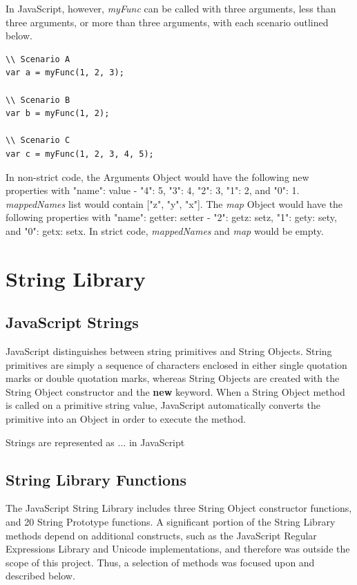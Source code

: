 \documentclass[a4paper,11pt,twoside]{report}
\begin{document}
In JavaScript, however, \textit{myFunc} can be called with three arguments, less than three arguments, or more than three arguments, with each scenario outlined below.
\begin{adjustwidth}{2cm}{2cm}
\begin{lstlisting}
\\ Scenario A
var a = myFunc(1, 2, 3);

\\ Scenario B
var b = myFunc(1, 2);

\\ Scenario C
var c = myFunc(1, 2, 3, 4, 5);
\end{lstlisting}
\end{adjustwidth}
In non-strict code, the Arguments Object would have the following new properties with "name": value - "4": 5, "3": 4, "2": 3, "1": 2, and "0": 1. \textit{mappedNames} list would contain ["z", "y", "x"]. The \textit{map} Object would have the following properties with "name": getter: setter - "2": getz: setz, "1": gety: sety, and "0": getx: setx. In strict code, \textit{mappedNames} and \textit{map} would be empty.

\chapter{String Library}
\section{JavaScript Strings}
JavaScript distinguishes between string primitives and String Objects. String primitives are simply a sequence of characters enclosed in either single quotation marks or double quotation marks, whereas String Objects are created with the String Object constructor and the \textbf{new} keyword. When a String Object method is called on a primitive string value, JavaScript automatically converts the primitive into an Object in order to execute the method.

Strings are represented as ... in JavaScript

\section{String Library Functions}\label{sec:stringmethods}
The JavaScript String Library includes three String Object constructor functions, and 20 String Prototype functions. A significant portion of the String Library methods depend on additional constructs, such as the JavaScript Regular Expressions Library and Unicode implementations, and therefore was outside the scope of this project. Thus, a selection of methods was focused upon and described below.
\end{document}
